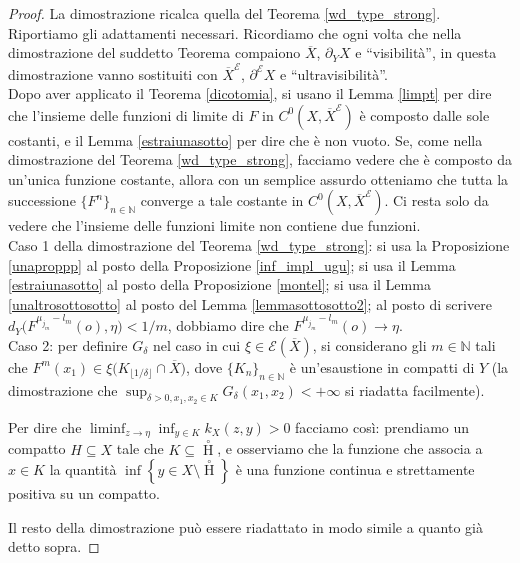 \begin{proof}
    La dimostrazione ricalca quella del Teorema \ref{wd_type_strong}. Riportiamo gli adattamenti necessari. Ricordiamo che ogni volta che nella dimostrazione del suddetto Teorema compaiono $\overline{X}$, $\partial_YX$ e ``visibilità'', in questa dimostrazione vanno sostituiti con $\overline{X}^\mathcal{E}$, $\partial^\mathcal{E}X$ e ``ultravisibilità''.\\

    Dopo aver applicato il Teorema \ref{dicotomia}, si usano il Lemma \ref{limpt} per dire che l'insieme delle funzioni di limite di $F$ in $C^0(X,\overline{X}^\mathcal{E})$ è composto dalle sole costanti, e il Lemma \ref{estraiunasotto} per dire che è non vuoto. Se, come nella dimostrazione del Teorema \ref{wd_type_strong}, facciamo vedere che è composto da un'unica funzione costante, allora con un semplice assurdo otteniamo che tutta la successione $\{F^n\}_{n\in\mathbb{N}}$ converge a tale costante in $C^0(X,\overline{X}^\mathcal{E})$. Ci resta solo da vedere che l'insieme delle funzioni limite non contiene due funzioni.\\

    Caso 1 della dimostrazione del Teorema \ref{wd_type_strong}: si usa la Proposizione \ref{unaproppp} al posto della Proposizione \ref{inf_impl_ugu}; si usa il Lemma \ref{estraiunasotto} al posto della Proposizione \ref{montel}; si usa il Lemma \ref{unaltrosottosotto} al posto del Lemma \ref{lemmasottosotto2}; al posto di scrivere $d_Y\big(F^{\mu_{j_m}-l_m}(o),\eta\big)<1/m$, dobbiamo dire che $F^{\mu_{j_m}-l_m}(o)\longrightarrow \eta$.\\

    Caso 2: per definire $G_\delta$ nel caso in cui $\xi\in\mathcal{E}(\overline{X})$, si considerano gli $m\in\mathbb{N}$ tali che $F^m(x_1)\in\xi\big(K_{\lfloor1/\delta\rfloor}\cap\overline{X}\big)$, dove $\{K_n\}_{n\in\mathbb{N}}$ è un'esaustione in compatti di $Y$ (la dimostrazione che $\displaystyle\sup_{\delta>0,x_1,x_2\in K}G_\delta(x_1,x_2)<+\infty$ si riadatta facilmente).
    
    Per dire che $\displaystyle\liminf_{z \longrightarrow\eta}\inf_{y\in K}k_X(z,y)>0$ facciamo così: prendiamo un compatto $H\subseteq X$ tale che $K\subseteq{\mathop H\limits^ \circ}$, e osserviamo che la funzione che associa a $x\in K$ la quantità $\inf\left\{y\in X\setminus\mathop H\limits^ \circ\right\}$ è una funzione continua e strettamente positiva su un compatto.

    Il resto della dimostrazione può essere riadattato in modo simile a quanto già detto sopra.
\end{proof}

